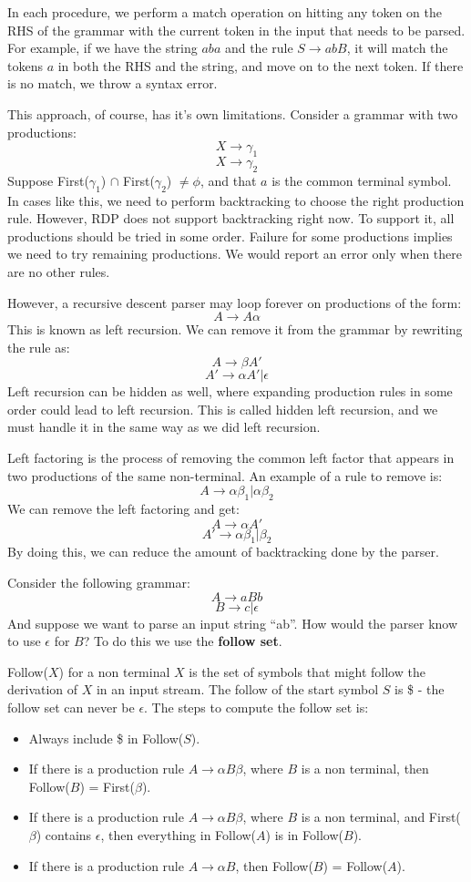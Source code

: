 \documentclass[12pt,letterpaper]{amsbook}
\theoremstyle{definition}
\begin{document}
In each procedure, we perform a match operation on hitting any token on the RHS of the grammar with the current token in the input that needs to be parsed. For example, if we have the string $aba$ and the rule $S \rightarrow abB$, it will match the tokens $a$ in both the RHS and the string, and move on to the next token. If there is no match, we throw a syntax error.

This approach, of course, has it's own limitations. Consider a grammar with two productions:
\[X \rightarrow \gamma_1\]
\[X \rightarrow \gamma_2\]
Suppose First($\gamma_1$) $\cap$ First($\gamma_2$) $\neq \phi$, and that $a$ is the common terminal symbol. In cases like this, we need to perform backtracking to choose the right production rule. However, RDP does not support backtracking right now. To support it, all productions should be tried in some order. Failure for some productions implies we need to try remaining productions. We would report an error only when there are no other rules.

However, a recursive descent parser may loop forever on productions of the form:
\[A \rightarrow A \alpha\]
This is known as left recursion. We can remove it from the grammar by rewriting the rule as:
\[A \rightarrow \beta A'\]
\[A' \rightarrow \alpha A'|\epsilon\]
Left recursion can be hidden as well, where expanding production rules in some order could lead to left recursion. This is called hidden left recursion, and we must handle it in the same way as we did left recursion.

Left factoring is the process of removing the common left factor that appears in two productions of the same non-terminal. An example of a rule to remove is:
\[A \rightarrow \alpha \beta_1|\alpha \beta_2\]
We can remove the left factoring and get:
\[A \rightarrow \alpha A'\]
\[A' \rightarrow \alpha \beta_1|\beta_2\]
By doing this, we can reduce the amount of backtracking done by the parser.

Consider the following grammar:
\[A \rightarrow aBb\]
\[B \rightarrow c | \epsilon\]
And suppose we want to parse an input string ``ab''. How would the parser know to use $\epsilon$ for $B$? To do this we use the \textbf{follow set}.

Follow($X$) for a non terminal $X$ is the set of symbols that might follow the derivation of $X$ in an input stream. The follow of the start symbol $S$ is \$ - the follow set can never be $\epsilon$. The steps to compute the follow set is:

\begin{itemize}
  \item Always include \$ in Follow($S$).
  \item If there is a production rule $A \rightarrow \alpha B \beta$, where $B$ is a non terminal, then Follow($B$)  = First($\beta$).
  \item If there is a production rule $A \rightarrow \alpha B \beta$, where $B$ is a non terminal, and First($\beta$) contains $\epsilon$, then everything in Follow($A$) is in Follow($B$).
  \item If there is a production rule $A \rightarrow \alpha B$, then Follow($B$) = Follow($A$).
\end{itemize}
\end{document}
